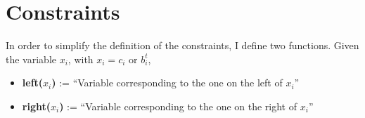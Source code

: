 \documentclass[letterpaper,10pt]{article}
\begin{document}
\section{Constraints}
In order to simplify the definition of the constraints, I define two functions. Given the variable $x_i$, with $x_i = c_i$ or $b_i^t$,
\begin{itemize}
    \item \textbf{left($x_i$)} := ``Variable corresponding to the one on the left of $x_i$''
    \item \textbf{right($x_i$)} := ``Variable corresponding to the one on the right of $x_i$''
\end{itemize}
\end{document}
